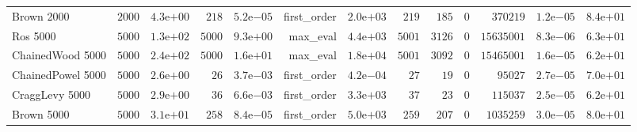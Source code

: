 \begin{longtable}[c]{lrrrrrrrrrrrr}
Brown 2000 & \( 2000\) & \( 4.3\)e\(+00\) & \(  218\) & \( 5.2\)e\(-05\) & first\_order & \( 2.0\)e\(+03\) & \(  219\) & \(  185\) & \(    0\) & \(370219\) & \( 1.2\)e\(-05\) & \( 8.4\)e\(+01\) \\
Ros 5000 & \( 5000\) & \( 1.3\)e\(+02\) & \( 5000\) & \( 9.3\)e\(+00\) & max\_eval & \( 4.4\)e\(+03\) & \( 5001\) & \( 3126\) & \(    0\) & \(15635001\) & \( 8.3\)e\(-06\) & \( 6.3\)e\(+01\) \\
ChainedWood 5000 & \( 5000\) & \( 2.4\)e\(+02\) & \( 5000\) & \( 1.6\)e\(+01\) & max\_eval & \( 1.8\)e\(+04\) & \( 5001\) & \( 3092\) & \(    0\) & \(15465001\) & \( 1.6\)e\(-05\) & \( 6.2\)e\(+01\) \\
ChainedPowel 5000 & \( 5000\) & \( 2.6\)e\(+00\) & \(   26\) & \( 3.7\)e\(-03\) & first\_order & \( 4.2\)e\(-04\) & \(   27\) & \(   19\) & \(    0\) & \(95027\) & \( 2.7\)e\(-05\) & \( 7.0\)e\(+01\) \\
CraggLevy 5000 & \( 5000\) & \( 2.9\)e\(+00\) & \(   36\) & \( 6.6\)e\(-03\) & first\_order & \( 3.3\)e\(+03\) & \(   37\) & \(   23\) & \(    0\) & \(115037\) & \( 2.5\)e\(-05\) & \( 6.2\)e\(+01\) \\
Brown 5000 & \( 5000\) & \( 3.1\)e\(+01\) & \(  258\) & \( 8.4\)e\(-05\) & first\_order & \( 5.0\)e\(+03\) & \(  259\) & \(  207\) & \(    0\) & \(1035259\) & \( 3.0\)e\(-05\) & \( 8.0\)e\(+01\) \\
\hline 
\end{longtable}



